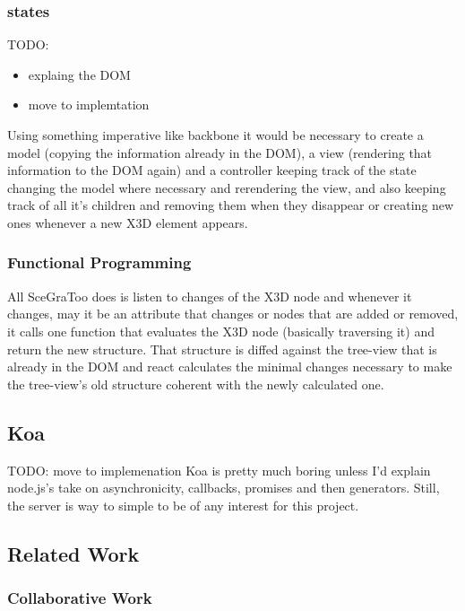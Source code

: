 \subsubsection{states}\label{states}

TODO:
\begin{itemize}
  \item explaing the DOM
  \item move to implemtation
\end{itemize}

Using something imperative like backbone it would be necessary to create
a model (copying the information already in the DOM), a view (rendering
that information to the DOM again) and a controller keeping track of the
state changing the model where necessary and rerendering the view, and
also keeping track of all it's children and removing them when they
disappear or creating new ones whenever a new X3D element appears.

\subsubsection{Functional Programming}\label{functional-programming}

All SceGraToo does is listen to changes of the \gls{X3D} node and whenever it
changes, may it be an attribute that changes or nodes that are added or
removed, it calls one function that evaluates the X3D node (basically
traversing it) and return the new structure. That structure is diffed
against the tree-view that is already in the DOM and react calculates
the minimal changes necessary to make the tree-view's old structure
coherent with the newly calculated one.

\subsection{Koa}\label{koa}

TODO: move to implemenation Koa is pretty much boring unless I'd explain
node.js's take on asynchronicity, callbacks, promises and then
generators. Still, the server is way to simple to be of any interest for
this project.

\subsection{Related Work}
\label{related-work}

\subsubsection{Collaborative Work}
\label{collaborative-work}
 

